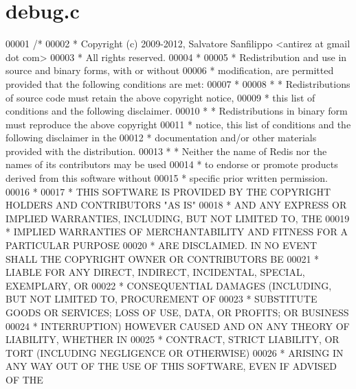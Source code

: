 \hypertarget{debug_8c_source}{}\section{debug.\+c}
\label{debug_8c_source}

\begin{DoxyCode}
00001 \textcolor{comment}{/*}
00002 \textcolor{comment}{ * Copyright (c) 2009-2012, Salvatore Sanfilippo <antirez at gmail dot com>}
00003 \textcolor{comment}{ * All rights reserved.}
00004 \textcolor{comment}{ *}
00005 \textcolor{comment}{ * Redistribution and use in source and binary forms, with or without}
00006 \textcolor{comment}{ * modification, are permitted provided that the following conditions are met:}
00007 \textcolor{comment}{ *}
00008 \textcolor{comment}{ *   * Redistributions of source code must retain the above copyright notice,}
00009 \textcolor{comment}{ *     this list of conditions and the following disclaimer.}
00010 \textcolor{comment}{ *   * Redistributions in binary form must reproduce the above copyright}
00011 \textcolor{comment}{ *     notice, this list of conditions and the following disclaimer in the}
00012 \textcolor{comment}{ *     documentation and/or other materials provided with the distribution.}
00013 \textcolor{comment}{ *   * Neither the name of Redis nor the names of its contributors may be used}
00014 \textcolor{comment}{ *     to endorse or promote products derived from this software without}
00015 \textcolor{comment}{ *     specific prior written permission.}
00016 \textcolor{comment}{ *}
00017 \textcolor{comment}{ * THIS SOFTWARE IS PROVIDED BY THE COPYRIGHT HOLDERS AND CONTRIBUTORS "AS IS"}
00018 \textcolor{comment}{ * AND ANY EXPRESS OR IMPLIED WARRANTIES, INCLUDING, BUT NOT LIMITED TO, THE}
00019 \textcolor{comment}{ * IMPLIED WARRANTIES OF MERCHANTABILITY AND FITNESS FOR A PARTICULAR PURPOSE}
00020 \textcolor{comment}{ * ARE DISCLAIMED. IN NO EVENT SHALL THE COPYRIGHT OWNER OR CONTRIBUTORS BE}
00021 \textcolor{comment}{ * LIABLE FOR ANY DIRECT, INDIRECT, INCIDENTAL, SPECIAL, EXEMPLARY, OR}
00022 \textcolor{comment}{ * CONSEQUENTIAL DAMAGES (INCLUDING, BUT NOT LIMITED TO, PROCUREMENT OF}
00023 \textcolor{comment}{ * SUBSTITUTE GOODS OR SERVICES; LOSS OF USE, DATA, OR PROFITS; OR BUSINESS}
00024 \textcolor{comment}{ * INTERRUPTION) HOWEVER CAUSED AND ON ANY THEORY OF LIABILITY, WHETHER IN}
00025 \textcolor{comment}{ * CONTRACT, STRICT LIABILITY, OR TORT (INCLUDING NEGLIGENCE OR OTHERWISE)}
00026 \textcolor{comment}{ * ARISING IN ANY WAY OUT OF THE USE OF THIS SOFTWARE, EVEN IF ADVISED OF THE}

\end{DoxyCode}
